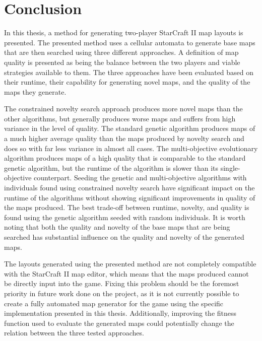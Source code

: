 \chapter{Conclusion}
\label{conclusion}
In this thesis, a method for generating two-player StarCraft II map layouts is presented. The presented method uses a cellular automata to generate base maps that are then searched using three different approaches. A definition of map quality is presented as being the balance between the two players and viable strategies available to them. The three approaches have been evaluated based on their runtime, their capability for generating novel maps, and the quality of the maps they generate.

The constrained novelty search approach produces more novel maps than the other algorithms, but generally produces worse maps and suffers from high variance in the level of quality. The standard genetic algorithm produces maps of a much higher average quality than the maps produced by novelty search and does so with far less variance in almost all cases. The multi-objective evolutionary algorithm produces maps of a high quality that is comparable to the standard genetic algorithm, but the runtime of the algorithm is slower than its single-objective counterpart. Seeding the genetic and multi-objective algorithms with individuals found using constrained novelty search have significant impact on the runtime of the algorithms without showing significant improvements in quality of the maps produced. The best trade-off between runtime, novelty, and quality is found using the genetic algorithm seeded with random individuals. It is worth noting that both the quality and novelty of the base maps that are being searched has substantial influence on the quality and novelty of the generated maps.

The layouts generated using the presented method are not completely compatible with the StarCraft II map editor, which means that the maps produced cannot be directly input into the game. Fixing this problem should be the foremost priority in future work done on the project, as it is not currently possible to create a fully automated map generator for the game using the specific implementation presented in this thesis. Additionally, improving the fitness function used to evaluate the generated maps could potentially change the relation between the three tested approaches.